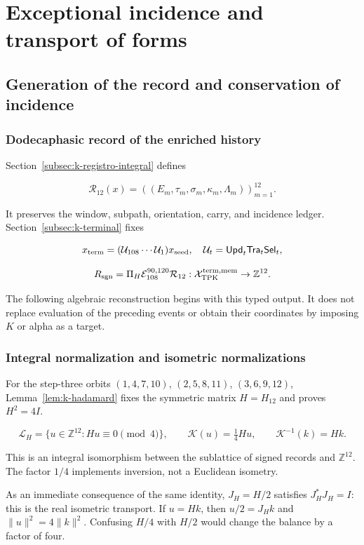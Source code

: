 \section{Exceptional incidence and transport of forms}
\label{nuclear:4}
\subsection{Generation of the record and conservation of incidence}

\subsubsection{Dodecaphasic record of the enriched history}

Section~\ref{subsec:k-registro-integral} defines

\[
\mathcal R_{12}(x)=((E_m,\tau_m,\sigma_m,\kappa_m,\Lambda_m))_{m=1}^{12}.
\]

It preserves the window, subpath, orientation, carry, and incidence ledger. Section~\ref{subsec:k-terminal} fixes

\[
x_{\rm term}=(\mathcal U_{108}\cdots\mathcal U_1)x_{\rm seed},
\quad \mathcal U_t=\mathsf{Upd}_t\mathsf{Tra}_t\mathsf{Sel}_t,
\]

\[
R_{\rm sgn}=\Pi_H\mathcal E_{108}^{90,120}\mathcal R_{12}:
\mathcal X_{\rm TPK}^{\rm term,mem}\to\mathbb Z^{12}.
\]

The following algebraic reconstruction begins with this typed output. It does not replace evaluation of the preceding events or obtain their coordinates by imposing \(K\) or alpha as a target.

\subsubsection{Integral normalization and isometric normalizations}

For the step-three orbits \((1,4,7,10)\), \((2,5,8,11)\), \((3,6,9,12)\), Lemma~\ref{lem:k-hadamard} fixes the symmetric matrix \(H=H_{12}\) and proves \(H^2=4I\).

\[
\mathcal L_H=\{u\in\mathbb Z^{12}:Hu\equiv0\pmod4\},
\qquad \mathscr K(u)=\tfrac14Hu,
\qquad \mathscr K^{-1}(k)=Hk.
\]

This is an integral isomorphism between the sublattice of signed records and \(\mathbb Z^{12}\). The factor \(1/4\) implements inversion, not a Euclidean isometry.

As an immediate consequence of the same identity, \(J_H=H/2\) satisfies \(J_H^*J_H=I\): this is the real isometric transport. If \(u=Hk\), then \(u/2=J_Hk\) and \(\|u\|^2=4\|k\|^2\). Confusing \(H/4\) with \(H/2\) would change the balance by a factor of four.

